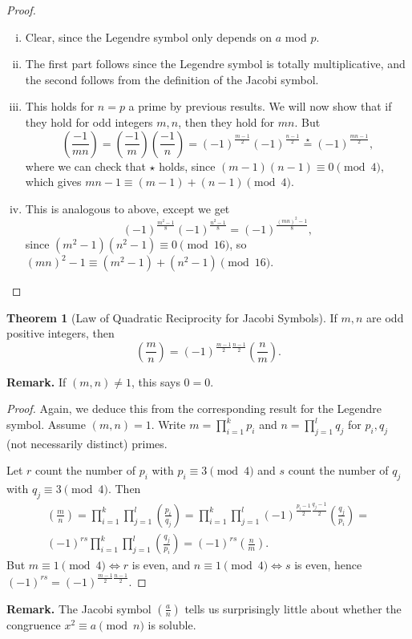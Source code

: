 \documentclass{article}
\theoremstyle{definition}
\newtheorem{theorem}{Theorem}[section]
\begin{document}
\begin{proof}
    \begin{enumerate}[(i)]
        \item Clear, since the Legendre symbol only depends on $a$ mod $p$.
        \item The first part follows since the Legendre symbol is totally multiplicative, and the second follows from the definition of the Jacobi symbol.
        \item This holds for $n=p$ a prime by previous results. We will now show that if they hold for odd integers $m,n$, then they hold for $mn$. But \[
        \left(\frac{-1}{mn} \right) = \left(\frac{-1}{m} \right) \left(\frac{-1}{n} \right) = (-1)^{\frac{m-1}{2}}(-1)^{\frac{n-1}{2}} \stackrel{\star}{=} (-1)^{\frac{mn-1}{2}},
        \]
        where we can check that $\star$ holds, since $(m-1)(n-1) \equiv  0 \pmod{4}$, which gives $mn-1 \equiv (m-1) + (n-1) \pmod{4}$.
        \item This is analogous to above, except we get \[
        (-1)^{\frac{m^2-1}{8}} (-1)^{\frac{n^2-1}{8}} = (-1)^{\frac{(mn)^2-1}{8}},
        \]
        since $(m^2-1)(n^2-1)\equiv 0 \pmod{16}$, so $(mn)^2-1 \equiv (m^2-1)+(n^2-1) \pmod{16}$.
    \end{enumerate}
\end{proof}
\begin{theorem}[Law of Quadratic Reciprocity for Jacobi Symbols]
    If $m,n$ are odd positive integers, then \[
    \left( \frac{m}{n} \right) = (-1)^{\frac{m-1}{2}\frac{n-1}{2}} \left(\frac{n}{m} \right).
    \]
\end{theorem}
\textbf{Remark.} If $(m,n) \neq 1$, this says $0=0$.
\begin{proof}
    Again, we deduce this from the corresponding result for the Legendre symbol. Assume $(m,n)=1$. Write $m = \prod_{i=1}^{k} p_i$ and $n=\prod_{j=1}^{l} q_j$ for $p_i,q_j$ (not necessarily distinct) primes.
    \vspace{1mm}
    
    Let $r$ count the number of $p_i$ with $p_i \equiv 3 \pmod{4}$ and $s$ count the number of $q_j$ with $q_j \equiv 3 \pmod{4}$. Then
    \begin{align*}
        \left(\frac{m}{n} \right) = \prod_{i=1}^{k} \prod_{j=1}^{l} \left(\frac{p_i}{q_j} \right) = \prod_{i=1}^{k} \prod_{j=1}^{l} (-1)^{\frac{p_i-1}{2}\frac{q_j-1}{2}} \left(\frac{q_j}{p_i} \right) = \\
        (-1)^{rs} \prod_{i=1}^{k} \prod_{j=1}^{l} \left(\frac{q_j}{p_i} \right) = (-1)^{rs} \left(\frac{n}{m}\right).  
    \end{align*}
    But $m \equiv 1 \pmod{4} \iff r$ is even, and $n \equiv 1 \pmod{4} \iff s$ is even, hence $(-1)^{rs} = (-1)^{\frac{m-1}{2}\frac{n-1}{2}}$. 
\end{proof}
\textbf{Remark.} The Jacobi symbol $\left(\frac{a}{n} \right) $ tells us surprisingly little about whether the congruence $x^2 \equiv a \pmod{n}$ is soluble. 
\end{document}
